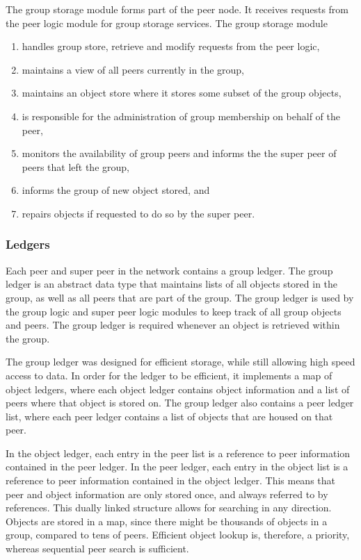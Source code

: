 The group storage module forms part of the peer node. It receives requests from the peer logic module for group storage services. The group storage module
\begin{enumerate}
  \item handles group store, retrieve and modify requests from the peer logic,
  \item maintains a view of all peers currently in the group,
  \item maintains an object store where it stores some subset of the group objects,
  \item is responsible for the administration of group membership on behalf of the peer,
  \item monitors the availability of group peers and informs the the super peer of peers that left the group,
  \item informs the group of new object stored, and
  \item repairs objects if requested to do so by the super peer.
\end{enumerate}

\subsubsection{Ledgers}
\label{pithos_module_types_ledgers}

Each peer and super peer in the network contains a group ledger. The group ledger is an abstract data type that maintains lists of all objects stored in the group, as well as all peers that are part of the group. The group ledger is used by the group logic and super peer logic modules to keep track of all group objects and peers. The group ledger is required whenever an object is retrieved within the group.

The group ledger was designed for efficient storage, while still allowing high speed access to data. In order for the ledger to be efficient, it implements a map of object ledgers, where each object ledger contains object information and a list of peers where that object is stored on. The group ledger also contains a peer ledger list, where each peer ledger contains a list of objects that are housed on that peer.

In the object ledger, each entry in the peer list is a reference to peer information contained in the peer ledger. In the peer ledger, each entry in the object list is a reference to peer information contained in the object ledger. This means that peer and object information are only stored once, and always referred to by references. This dually linked structure allows for searching in any direction. Objects are stored in a map, since there might be thousands of objects in a group, compared to tens of peers. Efficient object lookup is, therefore, a priority, whereas sequential peer search is sufficient.

